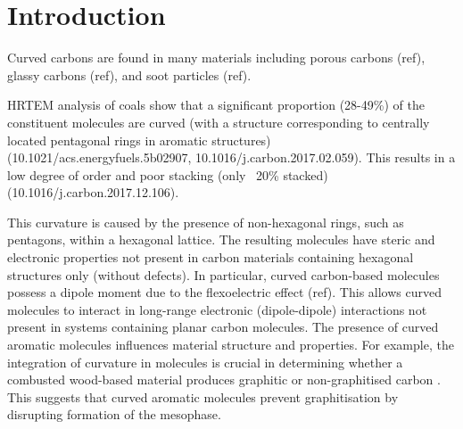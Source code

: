 \newcommand{\curPAHAP}{curPAHIP\xspace} 
%
\section{Introduction}
\label{sec:Introduction}

Curved carbons are found in many materials including porous carbons (ref), glassy carbons (ref), and soot particles (ref).

HRTEM analysis of coals show that a significant proportion (28-49\%) of the constituent molecules are curved (with a structure corresponding to centrally located pentagonal rings in aromatic structures) (10.1021/acs.energyfuels.5b02907, 10.1016/j.carbon.2017.02.059). This results in a low degree of order and poor stacking (only ~20\% stacked) (10.1016/j.carbon.2017.12.106).


This curvature is caused by the presence of non-hexagonal rings, such as pentagons, within a hexagonal lattice. The resulting molecules have steric and electronic properties not present in carbon materials containing hexagonal structures only (without defects). In particular, curved carbon-based molecules possess a dipole moment due to the flexoelectric effect (ref). This allows curved molecules to interact in long-range electronic (dipole-dipole) interactions not present in systems containing planar carbon molecules.
The presence of curved aromatic molecules influences material structure and properties. For example, the integration of curvature in molecules is crucial in determining whether a combusted wood-based material produces graphitic or non-graphitised carbon \cite{abrahamson2018carbon}. This suggests that curved aromatic molecules prevent graphitisation by disrupting formation of the mesophase. %

